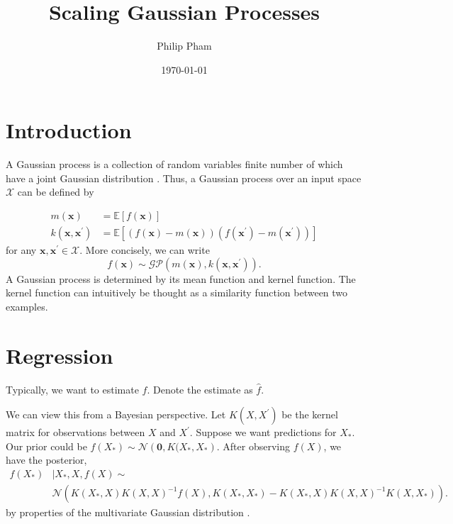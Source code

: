 \documentclass[letterpaper]{article}
\author{Philip Pham}
\title{Scaling Gaussian Processes}
\date{\today}
\begin{document}
\maketitle

\section*{Introduction}

A Gaussian process is a collection of random variables finite number of which
have a joint Gaussian distribution \citep{gpbook}. Thus, a Gaussian process over an input space
$\mathcal{X}$ can be defined by

\begin{align*}
  m(\mathbf{x})
  &= \mathbb{E}\left[f\left(\mathbf{x}\right)\right] \\
  k(\mathbf{x}, \mathbf{x}^\prime)
  &= \mathbb{E}\left[
    (f(\mathbf{x}) - m(\mathbf{x}))
    (f(\mathbf{x}^\prime) - m(\mathbf{x}^\prime))
    \right]
\end{align*}
for any $\mathbf{x}, \mathbf{x}^\prime \in \mathcal{X}$. More concisely, we can
write
\begin{equation}
  f\left(\mathbf{x}\right)
  \sim
  \mathcal{GP}\left(
    m\left(\mathbf{x}\right),
    k\left(\mathbf{x},\mathbf{x}^\prime\right)
  \right).
\end{equation}
A Gaussian process is determined by its mean function and kernel function. The
kernel function can intuitively be thought as a similarity function between two
examples.

\section*{Regression}

Typically, we want to estimate $f$. Denote the estimate as $\hat{f}$.

We can view this from a Bayesian perspective. Let $K(X, X^\prime)$ be the kernel
matrix for observations between $X$ and $X^\prime$. Suppose we want predictions
for $X_*$. Our prior could be
$f(X_*) \sim \mathcal{N}\left(\mathbf{0}, K(X_*, X_*\right)$. After observing
$f\left(X\right)$, we have the posterior,
\begin{align*}
  f(X_*) &\mid X_*, X, f(X) \sim \\
  &\mathcal{N}\left(
  K(X_*, X)K(X,X)^{-1}f(X),
  K(X_*,X_*) - K(X_*,X)K(X,X)^{-1}K(X,X_*)
  \right).
\end{align*}
by properties of the multivariate Gaussian distribution \citep{gpbook}.
\end{document}
